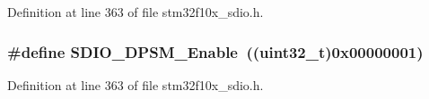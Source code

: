 Definition at line 363 of file stm32f10x\+\_\+sdio.\+h.

\subsubsection[{\texorpdfstring{S\+D\+I\+O\+\_\+\+D\+P\+S\+M\+\_\+\+Enable}{SDIO_DPSM_Enable}}]{\setlength{\rightskip}{0pt plus 5cm}\#define S\+D\+I\+O\+\_\+\+D\+P\+S\+M\+\_\+\+Enable~(({\bf uint32\+\_\+t})0x00000001)}\hypertarget{group___s_d_i_o___d_p_s_m___state_ga22bc12465c1cf839145619a859276c37}{}\label{group___s_d_i_o___d_p_s_m___state_ga22bc12465c1cf839145619a859276c37}


Definition at line 363 of file stm32f10x\+\_\+sdio.\+h.


